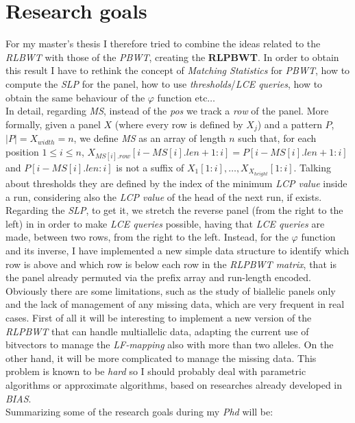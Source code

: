 \documentclass[a4paper,11pt, oneside]{article}
\begin{document}
\section*{Research goals}
For my master's thesis  I therefore tried to combine the ideas related to the
\textit{RLBWT} with those of the \textit{PBWT}, creating the \textbf{RLPBWT}. In
order to obtain this result I have to rethink the concept of \textit{Matching
  Statistics} for \textit{PBWT}, how to compute the \textit{SLP} for the panel,
how to use \textit{thresholds}/\textit{LCE queries}, how to obtain the same
behaviour of the $\varphi$ function etc$\ldots$\\
In detail, regarding \textit{MS}, instead of the \textit{pos} we track a
\textit{row} of the panel. More formally, given a panel $X$ (where every row is
defined by $X_j$) and a pattern $P$,
$|P|=X_{width}=n$, we define \textit{MS} as an array of length $n$ such that,
for each position $1\leq i\leq n$, $X_{MS[i].row}[i-MS[i].len+1:
i]=P[i-MS[i].len+1:i]$ and $P[i-MS[i].len:i]$ is not a suffix of
$X_1[1:i],\ldots,X_{X_{height}}[1:i]$. Talking about thresholds they are defined
by the index of the minimum \textit{LCP value} inside a run, considering also
the \textit{LCP value} of the head of the next run, if exists. Regarding
the \textit{SLP}, to get it, we stretch the reverse panel (from the right to
the left) in 
in order to make \textit{LCE queries} possible, having that \textit{LCE queries}
are made, between two rows, from the right to the left. Instead, for the
$\varphi$  function and its inverse, I have implemented a new simple data
structure to identify which row is above and which row is below each row in the
\textit{RLPBWT matrix}, that is the panel already permuted via the prefix array
and run-length encoded.\\
Obviously there are some limitations, such as the study of biallelic panels
only and the lack of management of any missing data, which are very frequent in
real cases. First of all it will be interesting to implement a new
version of the \textit{RLPBWT} that can handle multiallelic data, adapting the
current use of bitvectors to manage the \textit{LF-mapping} also with more than
two alleles. On the other hand, it will be more complicated to manage the
missing data. This problem is known to be \textit{hard} so I should probably
deal with parametric algorithms or approximate algorithms, based on researches
already developed in \textit{BIAS}.\\
Summarizing some of the research goals during my \textit{Phd} will be:
\end{document}
